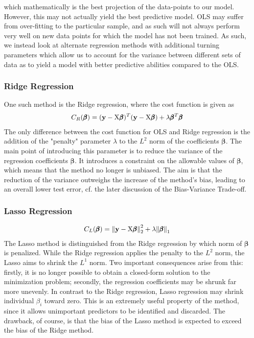 \documentclass[reprint, english, nofootinbib]{revtex4-2}
\begin{document}
            which mathematically is the best projection of the data-points to our model. However, this may not actually yield the best predictive model. OLS may suffer from over-fitting to the particular sample, and as such will not always perform very well on new data points for which the model has not been trained. As such, we instead look at alternate regression methods with additional turning parameters which allow us to account for the variance between different sets of data as to yield a model with better predictive abilities compared to the OLS.

        \subsubsection{Ridge Regression}
            \noindent
            One such method is the Ridge regression, where the cost function is given as
            \begin{equation}
                C_{R}(\pmb \beta)
                = (\mathbf y - \textup{X}\pmb\beta)^T(\mathbf y - \textup{X}\pmb\beta)
                + \lambda \pmb\beta^T\pmb\beta
            \end{equation}
			The only difference between the cost function for OLS and Ridge regression is the addition of the "penalty" parameter $\lambda$ to the $L^2$ norm of the coefficients $\pmb{\beta}$. The main point of introducing this parameter is to reduce the variance of the regression coefficients $\pmb{\beta}$. It introduces a constraint on the allowable values of $\pmb{\beta}$, which means that the method no longer is unbiased. The aim is that the reduction of the variance outweighs the increase of the method's bias, leading to an overall lower test error, cf. the later discussion of the Bias-Variance Trade-off.
        \subsubsection{Lasso Regression}
            \begin{equation}
                C_L(\pmb \beta) =
                \norm{\mathbf y - \textup{X}\pmb{\beta}}_2^2
                + \lambda\norm{\pmb{\beta}}_1
            \end{equation}
	       The Lasso method is distinguished from the Ridge regression by which norm of $\pmb{\beta}$ is penalized. While the Ridge regression applies the penalty to the $L^2$ norm, the Lasso aims to shrink the $L^1$ norm. Two important consequences arise from this: firstly, it is no longer possible to obtain a closed-form solution to the minimization problem; secondly, the regression coefficients may be shrunk far more unevenly. In contrast to the Ridge regression, Lasso regression may shrink individual $\beta_{i}$ toward zero. This is an extremely useful property of the method, since it allows unimportant predictors to be identified and discarded. The drawback, of course, is that the bias of the Lasso method is expected to exceed the bias of the Ridge method.
\end{document}
